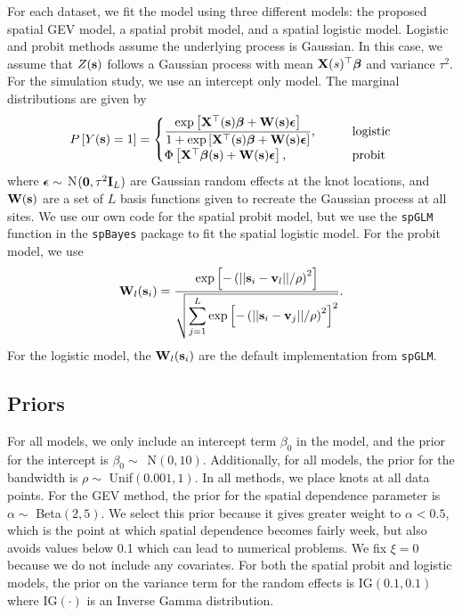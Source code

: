 For each dataset, we fit the model using three different models: the proposed spatial GEV model, a spatial probit model, and a spatial logistic model.
Logistic and probit methods assume the underlying process is Gaussian.
In this case, we assume that $Z(\mathbf{s})$ follows a Gaussian process with mean $\mathbf{X}(s)^\top \mbox{\boldmath $\beta$}$ and variance $\tau^2$.
For the simulation study, we use an intercept only model.
The marginal distributions are given by
\begin{align}
P\left[Y(\mathbf{s}) = 1\right] = \begin{cases}
\displaystyle \frac{\exp\left[\mathbf{X}^\top(\mathbf{s}) \mbox{\boldmath $\beta$} + \mathbf{W} (\mathbf{s}) \mbox{\boldmath $\epsilon$} \right]}{1 + \exp\left[\mathbf{X}^\top(\mathbf{s}) \mbox{\boldmath $\beta$} + \mathbf{W} (\mathbf{s}) \mbox{\boldmath $\epsilon$} \right]}, \qquad &\text{logistic}\\
\Phi\left[\mathbf{X}^\top \mbox{\boldmath $\beta$} (\mathbf{s}) + \mathbf{W} (\mathbf{s}) \mbox{\boldmath $\epsilon$} \right], \qquad &\text{probit}
\end{cases}
\end{align}
where $\mbox{\boldmath $\epsilon$} \sim$ N$(\mathbf{0}, \tau^2 \mathbf{I}_L)$ are Gaussian random effects at the knot locations, and $\mathbf{W}(\mathbf{s})$ are a set of $L$ basis functions given to recreate the Gaussian process at all sites.
We use our own code for the spatial probit model, but we use the \texttt{spGLM} function in the \texttt{spBayes} package \citep{Finley2015} to fit the spatial logistic model.
For the probit model, we use
\begin{align}
\mathbf{W}_l(\mathbf{s}_i) = \frac{\exp\left[-\left(||\mathbf{s}_i-\mathbf{v}_l||/\rho\right)^2\right]}
{\sqrt{\displaystyle \sum_{j=1}^L\exp\left[-\left(||\mathbf{s}_i-\mathbf{v}_j||/\rho\right)^2\right]^2}}.
\end{align}
For the logistic model, the $\mathbf{W}_l(\mathbf{s}_i)$ are the default implementation from \texttt{spGLM}.

\subsection{Priors} \label{rbs:simpriors}

For all models, we only include an intercept term $\beta_0$ in the model, and the prior for the intercept is \mbox{$\beta_0 \sim$ N$(0, 10)$}.
Additionally, for all models, the prior for the bandwidth is $\rho \sim$ Unif$(0.001, 1)$.
In all methods, we place knots at all data points.
For the GEV method, the prior for the spatial dependence parameter is $\alpha \sim$ Beta$(2, 5)$.
We select this prior because it gives greater weight to $\alpha < 0.5$, which is the point at which spatial dependence becomes fairly week, but also avoids values below 0.1 which can lead to numerical problems.
We fix $\xi = 0$ because we do not include any covariates.
For both the spatial probit and logistic models, the prior on the variance term for the random effects is IG$(0.1, 0.1)$ where IG$(\cdot)$ is an Inverse Gamma distribution.

